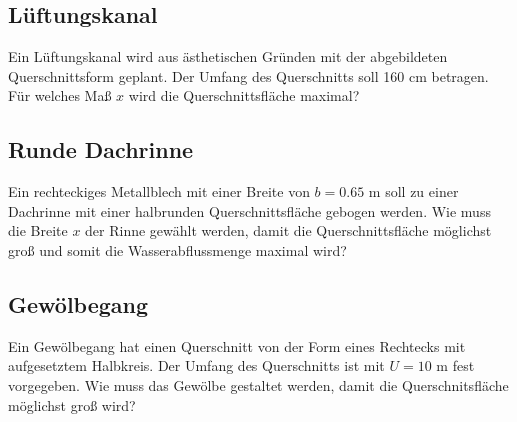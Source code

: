
\subsection{Lüftungskanal}
Ein Lüftungskanal wird aus ästhetischen
Gründen mit der abgebildeten Querschnittsform
geplant. Der Umfang des Querschnitts soll
160 cm betragen.
Für welches Maß $x$ wird die Querschnittsfläche
maximal?


\subsection{Runde Dachrinne}
Ein rechteckiges Metallblech mit einer Breite
von $b = 0.65 \text{ m}$ soll zu einer Dachrinne mit einer
halbrunden Querschnittsfläche gebogen werden.
Wie muss die Breite $x$ der Rinne gewählt werden,
damit die Querschnittsfläche möglichst groß und somit
die Wasserabflussmenge maximal wird?




\subsection{Gewölbegang}

Ein Gewölbegang hat einen Querschnitt
von der Form eines Rechtecks mit aufgesetztem Halbkreis. Der Umfang
des Querschnitts ist mit $U=10 \text{ m}$ fest vorgegeben.
Wie muss das Gewölbe gestaltet werden, damit die Querschnitsfläche
möglichst groß wird?


\newpage
